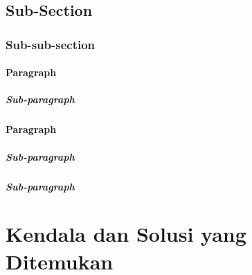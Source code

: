 \subsection{Sub-Section}

\subsubsection{Sub-sub-section}

\paragraph{Paragraph}

\subparagraph{Sub-paragraph}

\lipsum[27]

\paragraph{Paragraph}

\subparagraph{Sub-paragraph}
\subparagraph{Sub-paragraph}


\section{Kendala dan Solusi yang Ditemukan}